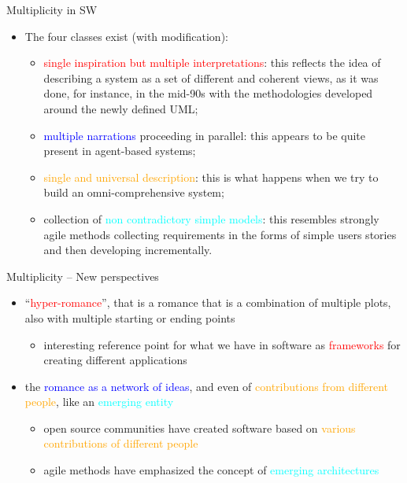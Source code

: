 \documentclass{beamer}
\begin{document}
\begin{frame}
{\centerline{Multiplicity in SW}}
\begin{itemize}
    \item The four classes exist (with modification):
    \begin{itemize}
        \item \textcolor{red}{single inspiration but multiple interpretations}: this reflects the idea of describing a system as a set of different and coherent views, as it was done, for instance, in the mid-90s with the methodologies developed around the newly defined UML;
        \item \textcolor{blue}{multiple narrations} proceeding in parallel: this appears to be quite present in agent-based systems;
        \item \textcolor{orange}{single and universal description}: this is what happens when we try to build an omni-comprehensive system;
        \item collection of \textcolor{cyan}{non contradictory simple models}: this resembles strongly agile methods collecting requirements in the forms of simple users stories and then developing incrementally.
    \end{itemize}

\end{itemize}   
\end{frame}

\begin{frame}
{\centerline{Multiplicity -- New perspectives}}
\begin{itemize}
    \item ``\textcolor{red}{hyper-romance}'', that is a romance that is a combination of multiple plots, also with multiple starting or ending points
    \begin{itemize}
        \item interesting reference point for what we have in software as \textcolor{red}{frameworks} for creating different applications
    \end{itemize} \vspace{0.2cm}
    \item the \textcolor{blue}{romance as a network of ideas}, and even of \textcolor{orange}{contributions from different people}, like an \textcolor{cyan}{emerging entity}
    \begin{itemize}
        \item open source communities have created software based on \textcolor{orange}{various contributions of different
        people}
        \item agile methods have emphasized the concept of \textcolor{cyan}{emerging architectures}
    \end{itemize}
\end{itemize}   
\end{frame}
\end{document}
